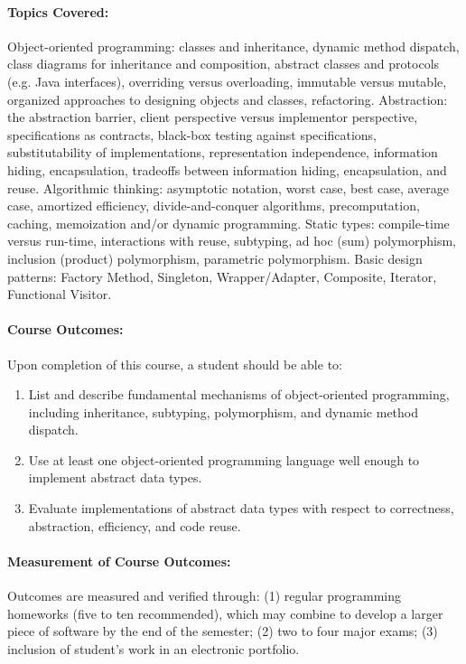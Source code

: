 \documentclass[11pt]{article}
\begin{document}
\paragraph{Topics Covered:}
%
Object-oriented programming:
%
classes and inheritance,
dynamic method dispatch,
class diagrams for inheritance and composition,
abstract classes and protocols (e.g. Java interfaces),
overriding versus overloading,
immutable versus mutable,
organized approaches to designing objects and classes,
refactoring.
%
Abstraction: 
%
the abstraction barrier,
client perspective versus implementor perspective,
specifications as contracts,
black-box testing against specifications,
substitutability of implementations,
representation independence,
information hiding,
encapsulation,
tradeoffs between information hiding, encapsulation, and reuse.
%
Algorithmic thinking:
%
asymptotic notation,
worst case, best case, average case,
amortized efficiency,
divide-and-conquer algorithms,
precomputation,
caching,
memoization and/or dynamic programming.
%
Static types:
%
compile-time versus run-time,
interactions with reuse,
subtyping,
ad hoc (sum) polymorphism, 
inclusion (product) polymorphism,
parametric polymorphism.
%
Basic design patterns:
%
Factory Method,
Singleton,
Wrapper/Adapter,
Composite,
Iterator,
Functional Visitor.

\paragraph{Course Outcomes:}
%
Upon completion of this course, a student should be able to: 
%
\begin{enumerate}
\item
List and describe fundamental mechanisms of object-oriented
programming, including inheritance, subtyping, polymorphism,
and dynamic method dispatch.
\item
Use at least one object-oriented programming language well
enough to implement abstract data types.
\item
Evaluate implementations of abstract data types with respect
to correctness, abstraction, efficiency, and code reuse.
\end{enumerate}


\paragraph{Measurement of Course Outcomes:}
%
Outcomes are measured and verified through: (1) regular programming
homeworks (five to ten recommended), which may combine to develop
a larger piece of software by the end of the semester; (2) two to four
major exams; (3) inclusion of student's work in an electronic portfolio.
\end{document}

